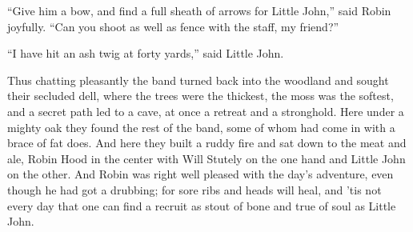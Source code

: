 ``Give him a bow, and find a full sheath of arrows for Little John,''
said Robin joyfully. ``Can you shoot as well as fence with the staff, my
friend?''

``I have hit an ash twig at forty yards,'' said Little John.

Thus chatting pleasantly the band turned back into the woodland and
sought their secluded dell, where the trees were the thickest, the moss
was the softest, and a secret path led to a cave, at once a retreat and
a stronghold. Here under a mighty oak they found the rest of the band,
some of whom had come in with a brace of fat does. And here they built a
ruddy fire and sat down to the meat and ale, Robin Hood in the center
with Will Stutely on the one hand and Little John on the other. And
Robin was right well pleased with the day's adventure, even though he
had got a drubbing; for sore ribs and heads will heal, and 'tis not
every day that one can find a recruit as stout of bone and true of soul
as Little John.
